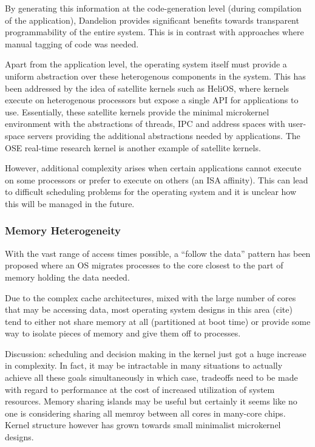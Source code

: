 By generating this information at the code-generation level (\ie during compilation of the application), Dandelion provides significant benefits towards transparent programmability of the entire system. This is in contrast with approaches where manual tagging of code was needed.


Apart from the application level, the operating system itself must provide a uniform abstraction over these heterogenous components in the system. This has been addressed by the idea of satellite kernels such as HeliOS, where kernels execute on heterogenous processors but expose a single API for applications to use. Essentially, these satellite kernels provide the minimal microkernel environment with the abstractions of threads, IPC and address spaces with user-space servers providing the additional abstractions needed by applications. The OSE real-time research kernel is another example of satellite kernels.

However, additional complexity arises when certain applications cannot execute on some processors or prefer to execute on others (\ie an ISA affinity). This can lead to difficult scheduling problems for the operating system and it is unclear how this will be managed in the future.


\subsubsection{Memory Heterogeneity}
With the vast range of access times possible, a ``follow the data'' pattern has been proposed where an OS migrates processes to the core closest to the part of memory holding the data needed.

Due to the complex cache architectures, mixed with the large number of cores that may be accessing data, most operating system designs in this area (cite) tend to either not share memory at all (partitioned at boot time) or provide some way to isolate pieces of memory and give them off to processes.

Discussion: scheduling and decision making in the kernel just got a huge increase in complexity. In fact, it may be intractable in many situations to actually achieve all these goals simultaneously in which case, tradeoffs need to be made with regard to performance at the cost of increased utilization of system resources. Memory sharing islands may be useful but certainly it seems like no one is considering sharing all memroy between all cores in many-core chips. Kernel structure however has grown towards small minimalist microkernel designs.


